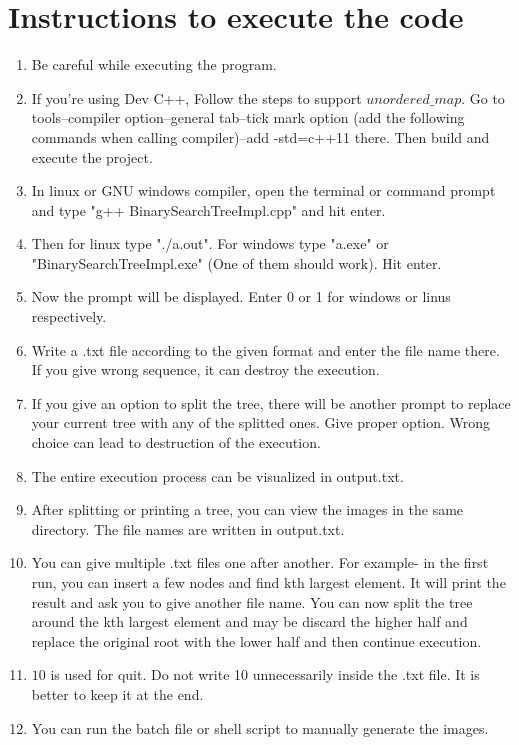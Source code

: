 \documentclass{article}
\begin{document}
\section{Instructions to execute the code}
\begin{enumerate}
	\item Be careful while executing the program.
	\item If you're using Dev C++, Follow the steps to support $unordered\_map$. Go to tools--compiler option--general tab--tick mark option (add the following commands when calling compiler)--add -std=c++11 there. Then build and execute the project.
	\item In linux or GNU windows compiler, open the terminal or command prompt and type "g++ BinarySearchTreeImpl.cpp" and hit enter.
	\item Then for linux type "./a.out". For windows type "a.exe" or "BinarySearchTreeImpl.exe" (One of them should work). Hit enter.
	\item Now the prompt will be displayed. Enter 0 or 1 for windows or linus respectively.
	\item Write a .txt file according to the given format and enter the file name there. If you give wrong sequence, it can destroy the execution.
	\item If you give an option to split the tree, there will be another prompt to replace your current tree with any of the splitted ones. Give proper option. Wrong choice can lead to destruction of the execution.
	\item The entire execution process can be visualized in output.txt.
	\item After splitting or printing a tree, you can view the images in the same directory. The file names are written in output.txt.
	\item You can give multiple .txt files one after another. For example- in the first run, you can insert a few nodes and find kth largest element. It will print the result and ask you to give another file name. You can now split the tree around the kth largest element and may be discard the higher half and replace the original root with the lower half and then continue execution.
	\item $10$ is used for quit. Do not write 10 unnecessarily inside the .txt file. It is better to keep it at the end.
	\item You can run the batch file or shell script to manually generate the images.
\end{enumerate}
\end{document}
